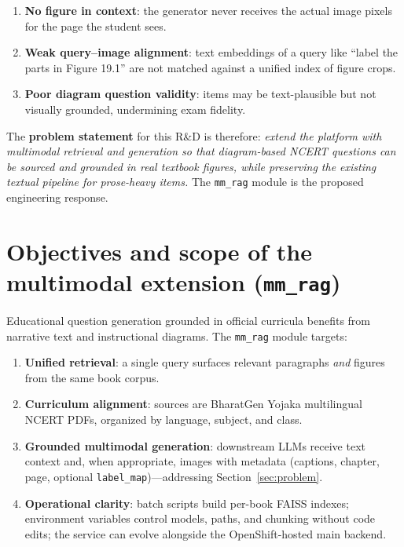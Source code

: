 \documentclass[11pt]{article}
\begin{document}
\begin{enumerate}
  \item \textbf{No figure in context}: the generator never receives the actual image pixels for the page the student sees.
  \item \textbf{Weak query--image alignment}: text embeddings of a query like ``label the parts in Figure 19.1'' are not matched against a unified index of figure crops.
  \item \textbf{Poor diagram question validity}: items may be text-plausible but not visually grounded, undermining exam fidelity.
\end{enumerate}

\noindent
The \textbf{problem statement} for this R\&D is therefore: \emph{extend the platform with multimodal retrieval and generation so that diagram-based NCERT questions can be sourced and grounded in real textbook figures, while preserving the existing textual pipeline for prose-heavy items.} The \texttt{mm\_rag} module is the proposed engineering response.

\section{Objectives and scope of the multimodal extension (\texttt{mm\_rag})}
\label{sec:objectives}

Educational question generation grounded in official curricula benefits from narrative text and instructional diagrams. The \texttt{mm\_rag} module targets:

\begin{enumerate}
  \item \textbf{Unified retrieval}: a single query surfaces relevant paragraphs \emph{and} figures from the same book corpus.
  \item \textbf{Curriculum alignment}: sources are BharatGen Yojaka multilingual NCERT PDFs, organized by language, subject, and class.
  \item \textbf{Grounded multimodal generation}: downstream LLMs receive text context and, when appropriate, images with metadata (captions, chapter, page, optional \texttt{label\_map})---addressing Section~\ref{sec:problem}.
  \item \textbf{Operational clarity}: batch scripts build per-book FAISS indexes; environment variables control models, paths, and chunking without code edits; the service can evolve alongside the OpenShift-hosted main backend.
\end{enumerate}
\end{document}
